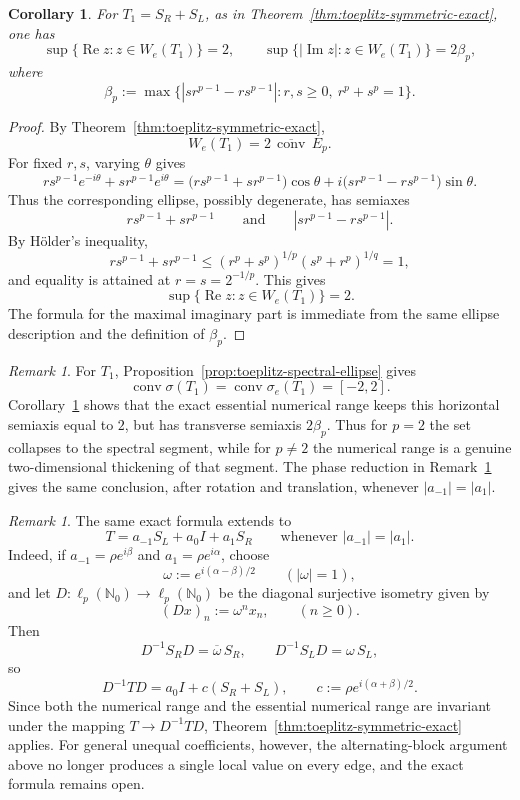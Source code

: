 \documentclass[11pt]{amsart}
\numberwithin{equation}{section}
\newtheorem{corollary}[theorem]{Corollary}
\theoremstyle{definition}
\theoremstyle{remark}
\newtheorem{remark}[theorem]{Remark}
\DeclareMathOperator{\conv}{conv}
\newcommand{\We}{W_e}
\begin{document}
\begin{corollary}
\label{cor:symmetric-toeplitz-bounds}
For \(T_1=S_R+S_L\), as in Theorem~\ref{thm:toeplitz-symmetric-exact}, one has
\[
\sup\{\operatorname{Re} z:z\in\We(T_1)\}=2,
\qquad
\sup\{|\operatorname{Im} z|:z\in\We(T_1)\}=2\beta_p,
\]
where
\[
\beta_p:=\max\{|sr^{p-1}-rs^{p-1}|:r,s\ge0,\ r^p+s^p=1\}.
\]
\end{corollary}

\begin{proof}
By Theorem~\ref{thm:toeplitz-symmetric-exact},
\[
\We(T_1)=2\,\overline{\conv}\,E_p.
\]
For fixed $r,s$, varying $\theta$ gives
\[
rs^{p-1}e^{-i\theta}+sr^{p-1}e^{i\theta}
=\bigl(rs^{p-1}+sr^{p-1}\bigr)\cos\theta
+i\bigl(sr^{p-1}-rs^{p-1}\bigr)\sin\theta.
\]
Thus the corresponding ellipse, possibly degenerate, has semiaxes
\[
rs^{p-1}+sr^{p-1}
\qquad\text{and}\qquad
|sr^{p-1}-rs^{p-1}|.
\]
By H\"older's inequality,
\[
rs^{p-1}+sr^{p-1}\le (r^p+s^p)^{1/p}(s^p+r^p)^{1/q}=1,
\]
and equality is attained at $r=s=2^{-1/p}$. This gives
\[
\sup\{\operatorname{Re} z:z\in\We(T_1)\}=2.
\]
The formula for the maximal imaginary part is immediate from the same ellipse description and the definition of $\beta_p$.
\end{proof}

\begin{remark}\label{rem:symmetric-spectral-comparison}
For $T_1$, Proposition~\ref{prop:toeplitz-spectral-ellipse} gives
\[
        \conv\sigma(T_1)=\conv\sigma_e(T_1)=[-2,2].
\]
Corollary~\ref{cor:symmetric-toeplitz-bounds} shows that the exact essential numerical range keeps this horizontal semiaxis equal to $2$, but has transverse semiaxis $2\beta_p$. Thus for $p=2$ the set collapses to the spectral segment, while for $p\ne2$ the numerical range is a genuine two-dimensional thickening of that segment. The phase reduction in Remark~\ref{rem:toeplitz-balanced-phase-reduction} gives the same conclusion, after rotation and translation, whenever $|a_{-1}|=|a_1|$.
\end{remark}

\begin{remark}
\label{rem:toeplitz-balanced-phase-reduction}
The same exact formula extends to
\[
T=a_{-1}S_L+a_0I+a_1S_R
\qquad\text{whenever } |a_{-1}|=|a_1|.
\]
Indeed, if $a_{-1}=\rho e^{i\beta}$ and $a_1=\rho e^{i\alpha}$, choose
\[
\omega:=e^{i(\alpha-\beta)/2}
\qquad (|\omega|=1),
\]
and let $D:\ell_p(\mathbb N_0)\to\ell_p(\mathbb N_0)$ be the diagonal surjective isometry given by
\[
(Dx)_n:=\omega^n x_n, \qquad (n \ge 0).
\]
Then
\[
D^{-1}S_RD=\overline\omega\,S_R,
\qquad
D^{-1}S_LD=\omega\,S_L,
\]
so
\[
D^{-1}TD=a_0I+c(S_R+S_L),
\qquad
c:=\rho e^{i(\alpha+\beta)/2}.
\]
Since both the numerical range and the essential numerical range are invariant under the mapping \(T \to D^{-1}TD\),
 Theorem~\ref{thm:toeplitz-symmetric-exact} applies. For general unequal coefficients, however, the alternating-block argument above no longer produces a single local value on every edge, and the exact formula remains open.
\end{remark}
\end{document}
